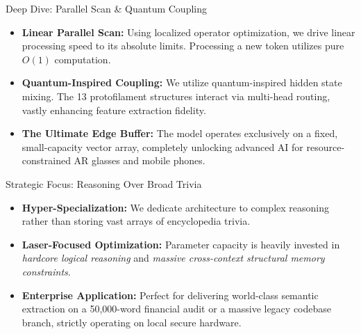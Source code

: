 ﻿\documentclass[aspectratio=169, 10pt]{beamer}
\begin{document}
\begin{frame}{Deep Dive: Parallel Scan \& Quantum Coupling}
\begin{itemize}
    \item \textbf{Linear Parallel Scan:} Using localized operator optimization, we drive linear processing speed to its absolute limits. Processing a new token utilizes pure $O(1)$ computation.
    \item \textbf{Quantum-Inspired Coupling:} We utilize quantum-inspired hidden state mixing. The 13 protofilament structures interact via multi-head routing, vastly enhancing feature extraction fidelity.
    \item \textbf{The Ultimate Edge Buffer:} The model operates exclusively on a fixed, small-capacity vector array, completely unlocking advanced AI for resource-constrained AR glasses and mobile phones.
\end{itemize}
\end{frame}

\begin{frame}{Strategic Focus: Reasoning Over Broad Trivia}
\begin{itemize}
    \item \textbf{Hyper-Specialization:} We dedicate architecture to complex reasoning rather than storing vast arrays of encyclopedia trivia.
    \item \textbf{Laser-Focused Optimization:} Parameter capacity is heavily invested in \textit{hardcore logical reasoning} and \textit{massive cross-context structural memory constraints}.
    \item \textbf{Enterprise Application:} Perfect for delivering world-class semantic extraction on a 50,000-word financial audit or a massive legacy codebase branch, strictly operating on local secure hardware.
\end{itemize}
\end{frame}
\end{document}
